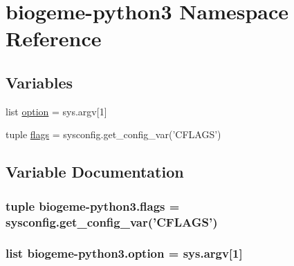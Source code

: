 \hypertarget{namespacebiogeme-python3}{\section{biogeme-\/python3 Namespace Reference}
\label{namespacebiogeme-python3}
}
\subsection*{Variables}
\begin{DoxyCompactItemize}
\item 
list \hyperlink{namespacebiogeme-python3_aa0716b6f7ced61a5074bdb69f56b7d68}{option} = sys.\+argv\mbox{[}1\mbox{]}
\item 
tuple \hyperlink{namespacebiogeme-python3_abf581ce35321a9416791caf6e16f81a9}{flags} = sysconfig.\+get\+\_\+config\+\_\+var('C\+F\+L\+A\+G\+S')
\end{DoxyCompactItemize}


\subsection{Variable Documentation}
\hypertarget{namespacebiogeme-python3_abf581ce35321a9416791caf6e16f81a9}{
\subsubsection[{flags}]{\setlength{\rightskip}{0pt plus 5cm}tuple biogeme-\/python3.\+flags = sysconfig.\+get\+\_\+config\+\_\+var('C\+F\+L\+A\+G\+S')}}\label{namespacebiogeme-python3_abf581ce35321a9416791caf6e16f81a9}
\hypertarget{namespacebiogeme-python3_aa0716b6f7ced61a5074bdb69f56b7d68}{
\subsubsection[{option}]{\setlength{\rightskip}{0pt plus 5cm}list biogeme-\/python3.\+option = sys.\+argv\mbox{[}1\mbox{]}}}\label{namespacebiogeme-python3_aa0716b6f7ced61a5074bdb69f56b7d68}
